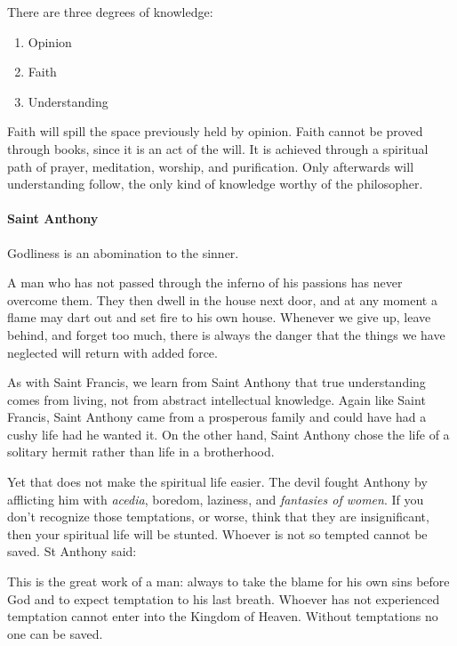 There are three degrees of knowledge:

\begin{enumerate}


\item Opinion

\item Faith

\item Understanding
\end{enumerate}


Faith will spill the space previously held by opinion. Faith cannot be proved through books, since it is an act of the will. It is achieved through a spiritual path of prayer, meditation, worship, and purification. Only afterwards will understanding follow, the only kind of knowledge worthy of the philosopher.

\paragraph{Saint Anthony}


\begin{quotex}
Godliness is an abomination to the sinner.

A man who has not passed through the inferno of his passions has never overcome them. They then dwell in the house next door, and at any moment a flame may dart out and set fire to his own house. Whenever we give up, leave behind, and forget too much, there is always the danger that the things we have neglected will return with added force.
\end{quotex}


As with Saint Francis, we learn from Saint Anthony that true understanding comes from living, not from abstract intellectual knowledge. Again like Saint Francis, Saint Anthony came from a prosperous family and could have had a cushy life had he wanted it. On the other hand, Saint Anthony chose the life of a solitary hermit rather than life in a brotherhood.

Yet that does not make the spiritual life easier. The devil fought Anthony by afflicting him with \emph{acedia}, boredom, laziness, and \emph{fantasies of women}. If you don't recognize those temptations, or worse, think that they are insignificant, then your spiritual life will be stunted. Whoever is not so tempted cannot be saved. St Anthony said:

\begin{quotex}
This is the great work of a man: always to take the blame for his own sins before God and to expect temptation to his last breath. Whoever has not experienced temptation cannot enter into the Kingdom of Heaven. Without temptations no one can be saved.
\end{quotex}


